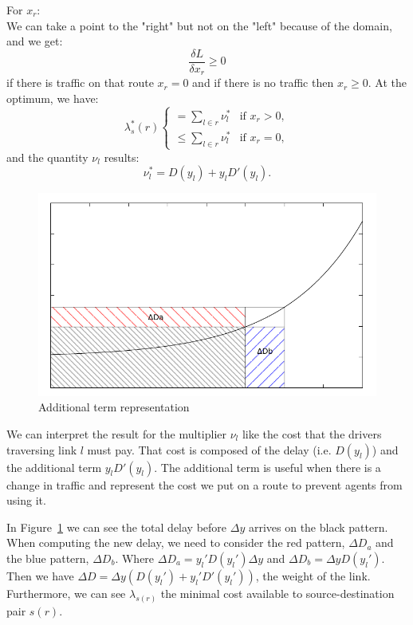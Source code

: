 For $x_r$:\\
We can take a point to the "right" but not on the "left" because of the domain, and we get:
$$ \frac{\delta L}{\delta x_r} \geq 0$$
if there is traffic on that route $x_r = 0$ and if there is no traffic then $x_r \geq 0$.
At the optimum, we have:
\begin{equation}
\lambda^*_s(r)
\begin{cases}
= \sum_{l \in r} \nu^*_l & \mbox{if } x_r > 0,\\
\leq \sum_{l \in r} \nu^*_l & \mbox{if } x_r = 0,
\end{cases}
\end{equation}
and the quantity $\nu_l$ results:
\begin{equation}
\nu^*_l = D(y_l)+  y_l D'(y_l).
\end{equation} 

\begin{figure}[h!]
\centering
\includegraphics[scale=.7]{fig3.pdf}
\caption{Additional term representation}
\label{fig:3}
\end{figure}

We can interpret the result for the multiplier $\nu_l$ like the cost that the drivers traversing link $l$ must pay. That cost is composed of the delay (i.e. $D(y_l)$) and the additional term $y_l D'(y_l)$. The additional term is useful when there is a change in traffic and represent the cost we put on a route to prevent agents from using it.

In Figure~\ref{fig:3} we can see the total delay before $\Delta y$ arrives on the black pattern. When computing the new delay, we need to consider the red pattern, $\Delta D_{a}$ and the blue pattern, $\Delta D_{b}$. Where $\Delta D_{a} = y_l'D(y_l') \Delta y$ and $\Delta D_b = \Delta y D(y_l')$. Then we have $\Delta D = \Delta y (D(y_l')+y_l'D'(y_l'))$, the weight of the link. Furthermore, we can see $\lambda_{s(r)}$ the minimal cost available to source-destination pair $s(r)$. 

